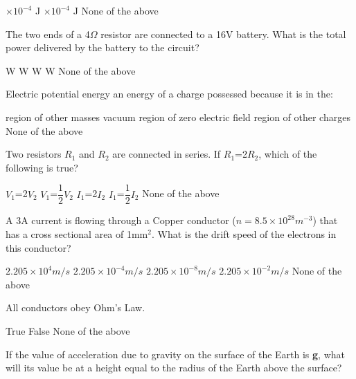\documentclass[13pt,addpoints]{exam}
\begin{document}
{{{\begin{questions}
\begin{oneparchoices}
						$\times10^{-4}$ J
						$\times10^{-4}$ J
						\choice None of the above
					\end{oneparchoices}
					\question The two ends of a 4$\Omega$ resistor are connected to a 16V battery. What is the total power delivered by the battery to the circuit?\\
					\begin{oneparchoices}
						 W 
						 W
						 W
						 W
						\choice None of the above
					\end{oneparchoices}
					\question Electric potential energy an energy of a charge possessed because it is in the:\\
					\begin{oneparchoices}
						\choice region of other masses
						\choice vacuum
						\choice region of zero electric field
						\choice region of other charges
						\choice None of the above
					\end{oneparchoices}
					\question Two resistors $R_1$ and $R_2$ are connected in series. If $R_1$=2$R_2$, which of the following is true?\\
					\begin{oneparchoices}
						\choice $V_1$=2$V_2$
						\choice $V_1$=$\dfrac{1}{2}$$V_2$
						\choice $I_1$=2$I_2$
						\choice $I_1$=$\dfrac{1}{2}$$I_2$
						\choice None of the above
					\end{oneparchoices}
					\question A 3A current is flowing through a Copper conductor ($n= 8.5\times10^{28}m^{-3}$) that has a cross sectional area of 1mm$^2$. What is the drift speed of the electrons in this conductor?\\
					\begin{oneparchoices}
						\choice $2.205\times10^{4}m/s$
						\choice $2.205\times10^{-4}m/s$
						\choice $2.205\times10^{-8}m/s$
						\choice $2.205\times10^{-2}m/s$
						\choice None of the above
					\end{oneparchoices}
					\question All conductors obey Ohm's Law.\\
					\begin{oneparchoices}
						\choice True
						\choice False
						\choice None of the above
					\end{oneparchoices}
					\question If the value of acceleration due to gravity on the surface of the Earth is \textbf{g}, what will its value be at a height equal to the radius of the Earth above the surface?\\ \\

\end{questions}}}}
\end{document}

